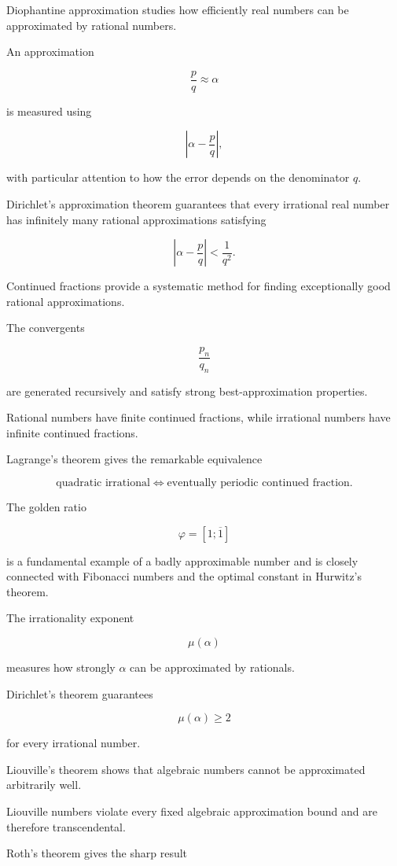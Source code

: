Diophantine approximation studies how efficiently real numbers can be
approximated by rational numbers.

An approximation

\[ \frac pq\approx\alpha \]

is measured using

\[ \left|\alpha-\frac pq\right|, \]

with particular attention to how the error depends on the denominator \(q\).

Dirichlet's approximation theorem guarantees that every irrational real
number has infinitely many rational approximations satisfying

\[ \boxed{\left|\alpha-\frac pq\right|<\frac1{q^2}.} \]

Continued fractions provide a systematic method for finding exceptionally
good rational approximations.

The convergents

\[ \frac{p_n}{q_n} \]

are generated recursively and satisfy strong best-approximation properties.

Rational numbers have finite continued fractions, while irrational numbers
have infinite continued fractions.

Lagrange's theorem gives the remarkable equivalence

\[
\boxed{
\text{quadratic irrational}
\iff
\text{eventually periodic continued fraction}.
}
\]

The golden ratio

\[ \varphi=[1;\overline1] \]

is a fundamental example of a badly approximable number and is closely
connected with Fibonacci numbers and the optimal constant in Hurwitz's
theorem.

The irrationality exponent

\[ \mu(\alpha) \]

measures how strongly \(\alpha\) can be approximated by rationals.

Dirichlet's theorem guarantees

\[ \mu(\alpha)\geq2 \]

for every irrational number.

Liouville's theorem shows that algebraic numbers cannot be approximated
arbitrarily well.

Liouville numbers violate every fixed algebraic approximation bound and are
therefore transcendental.

Roth's theorem gives the sharp result

